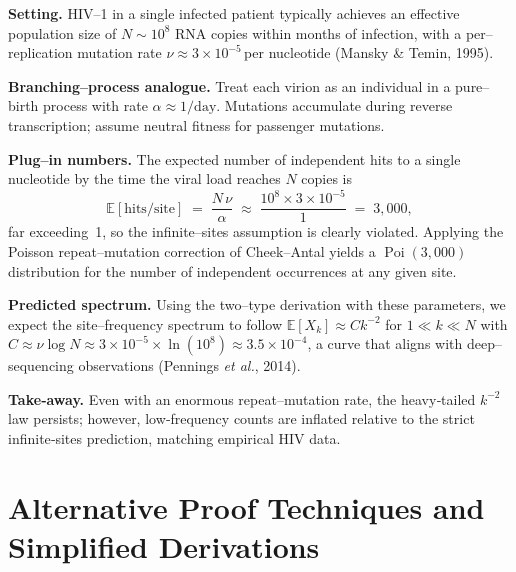\documentclass[11pt]{article}
\begin{document}
\begin{tcolorbox}[title={Concrete Example: HIV Within--Host Mutation Spectrum},
                  coltitle=black,colback=gray!5,colframe=gray!50,
                  fonttitle=\bfseries]

\textbf{Setting.}  HIV--1 in a single infected patient typically achieves an
effective population size of $N \sim 10^{8}$ RNA copies within
months of infection, with a per--replication mutation rate
$\nu \approx 3\times10^{-5}$\,per nucleotide (Mansky \& Temin, 1995).

\textbf{Branching--process analogue.}  Treat each virion as an
individual in a pure--birth process with rate $\alpha\approx1/\text{day}$.
Mutations accumulate during reverse transcription; assume neutral
fitness for passenger mutations.

\textbf{Plug–in numbers.}  The expected number of independent hits to a
single nucleotide by the time the viral load reaches $N$ copies is
\[
\mathbb{E}[\text{hits/site}]
      \;=\; \frac{N \,\nu}{\alpha}
      \;\approx\;
      \frac{10^{8}\times 3\!\times\!10^{-5}}{1}
      \;=\; 3{,}000,
\]
far exceeding~1, so the infinite--sites assumption is clearly violated.
Applying the Poisson repeat–mutation correction of Cheek--Antal yields
a $\operatorname{Poi}(3{,}000)$ distribution for the number of independent
occurrences at any given site.

\textbf{Predicted spectrum.}  Using the two--type derivation with these parameters, we expect
the site–frequency spectrum to follow
$\mathbb{E}[X_k]\approx C k^{-2}$ for $1\ll k\ll N$
with
$C\approx \nu \log N \approx 3\times10^{-5}\times\ln(10^{8})\approx3.5\times10^{-4}$,
a curve that aligns with deep–sequencing observations (Pennings
\textit{et al.}, 2014).

\textbf{Take‑away.}  Even with an enormous repeat–mutation rate,
the heavy‑tailed $k^{-2}$ law persists; however, low‑frequency counts
are inflated relative to the strict infinite‐sites prediction,
matching empirical HIV data.

\end{tcolorbox}


\section{Alternative Proof Techniques and Simplified Derivations}
\end{document}
